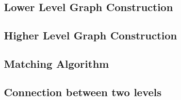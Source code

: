 \documentclass[
	fontsize=12pt,
	paper=a4,
	twoside=false,
	numbers=noenddot,
	plainheadsepline,
	toc=listof,
	toc=bibliography
]{scrartcl}
\begin{document}
\subsection{Lower Level Graph Construction}



\subsection{Higher Level Graph Construction}


\subsection{Matching Algorithm}


\subsection{Connection between two levels}


%

	
\end{document}
